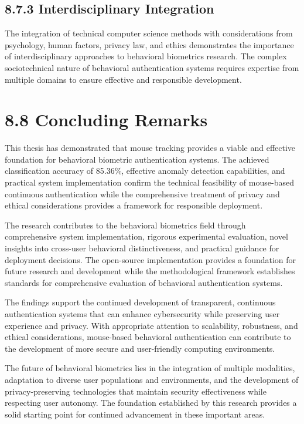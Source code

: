 \documentclass[
  12pt,
  a4paper,
]{report}
\begin{document}
\subsection{8.7.3 Interdisciplinary
Integration}\label{interdisciplinary-integration}

The integration of technical computer science methods with
considerations from psychology, human factors, privacy law, and ethics
demonstrates the importance of interdisciplinary approaches to
behavioral biometrics research. The complex sociotechnical nature of
behavioral authentication systems requires expertise from multiple
domains to ensure effective and responsible development.

\section{8.8 Concluding Remarks}\label{concluding-remarks}

This thesis has demonstrated that mouse tracking provides a viable and
effective foundation for behavioral biometric authentication systems.
The achieved classification accuracy of 85.36\%, effective anomaly
detection capabilities, and practical system implementation confirm the
technical feasibility of mouse-based continuous authentication while the
comprehensive treatment of privacy and ethical considerations provides a
framework for responsible deployment.

The research contributes to the behavioral biometrics field through
comprehensive system implementation, rigorous experimental evaluation,
novel insights into cross-user behavioral distinctiveness, and practical
guidance for deployment decisions. The open-source implementation
provides a foundation for future research and development while the
methodological framework establishes standards for comprehensive
evaluation of behavioral authentication systems.

The findings support the continued development of transparent,
continuous authentication systems that can enhance cybersecurity while
preserving user experience and privacy. With appropriate attention to
scalability, robustness, and ethical considerations, mouse-based
behavioral authentication can contribute to the development of more
secure and user-friendly computing environments.

The future of behavioral biometrics lies in the integration of multiple
modalities, adaptation to diverse user populations and environments, and
the development of privacy-preserving technologies that maintain
security effectiveness while respecting user autonomy. The foundation
established by this research provides a solid starting point for
continued advancement in these important areas.
\end{document}
